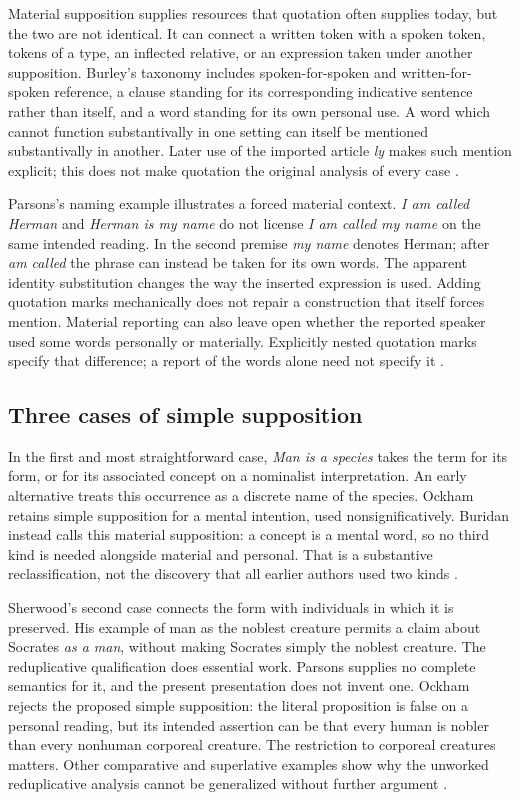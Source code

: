 Material supposition supplies resources that quotation often supplies
today, but the two are not identical. It can connect a written token
with a spoken token, tokens of a type, an inflected relative, or an
expression taken under another supposition. Burley's taxonomy includes
spoken-for-spoken and written-for-spoken reference, a clause standing
for its corresponding indicative sentence rather than itself, and a
word standing for its own personal use. A word which cannot function
substantivally in one setting can itself be mentioned substantivally in
another. Later use of the imported article \emph{ly} makes such mention
explicit; this does not make quotation the original analysis of every
case \cite[pp.~194--196]{Parsons2007FordhamSupposition}.

Parsons's naming example illustrates a forced material context.
\emph{I am called Herman} and \emph{Herman is my name} do not license
\emph{I am called my name} on the same intended reading. In the second
premise \emph{my name} denotes Herman; after \emph{am called} the
phrase can instead be taken for its own words. The apparent identity
substitution changes the way the inserted expression is used. Adding
quotation marks mechanically does not repair a construction that itself
forces mention. Material reporting can also leave open whether the
reported speaker used some words personally or materially. Explicitly
nested quotation marks specify that difference; a report of the words
alone need not specify it
\cite[pp.~196--197]{Parsons2007FordhamSupposition}.

\subsection{Three cases of simple supposition}
\label{sec:p13-supposition-simple}

In the first and most straightforward case, \emph{Man is a species}
takes the term for its form, or for its associated concept on a
nominalist interpretation. An early alternative treats this occurrence
as a discrete name of the species. Ockham retains simple supposition for
a mental intention, used nonsignificatively. Buridan instead calls this
material supposition: a concept is a mental word, so no third kind is
needed alongside material and personal. That is a substantive
reclassification, not the discovery that all earlier authors used two
kinds \cite[pp.~197--199]{Parsons2007FordhamSupposition}.

Sherwood's second case connects the form with individuals in which it
is preserved. His example of man as the noblest creature permits a
claim about Socrates \emph{as a man}, without making Socrates simply
the noblest creature. The reduplicative qualification does essential
work. Parsons supplies no complete semantics for it, and the present
presentation does not invent one. Ockham rejects the proposed simple
supposition: the literal proposition is false on a personal reading,
but its intended assertion can be that every human is nobler than every
nonhuman corporeal creature. The restriction to corporeal creatures
matters. Other comparative and superlative examples show why the
unworked reduplicative analysis cannot be generalized without further
argument \cite[pp.~199--201]{Parsons2007FordhamSupposition}.

